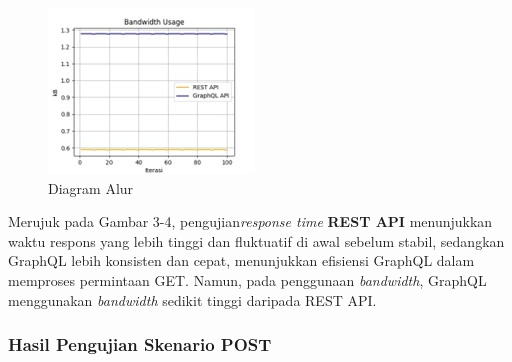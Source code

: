 \documentclass[
 manuscript=article,  %
  layout=publish, 
  year=2024, 
  month= Februari, %
  volume=8,
  number=1 
]{JIKO}
\begin{document}
\begin{minipage}{0.48\textwidth}
    \begin{figure}[H]
        \centering
        \includegraphics[width=\textwidth]{assets/Picture4.jpg}
        \caption{Diagram Alur}
        \label{fig:diagram}
    \end{figure}
\end{minipage}








Merujuk pada Gambar 3-4, pengujian\textit{response time} \textbf{REST API} menunjukkan waktu respons yang lebih tinggi dan fluktuatif di awal sebelum stabil, sedangkan GraphQL lebih konsisten dan cepat, menunjukkan efisiensi GraphQL dalam memproses permintaan GET. Namun, pada penggunaan \textit{bandwidth}, GraphQL menggunakan \textit{bandwidth} sedikit tinggi daripada REST API.

\subsubsection{Hasil Pengujian Skenario POST}
\end{document}
